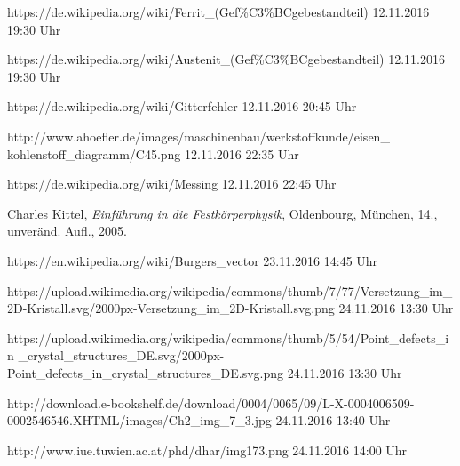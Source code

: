 \documentclass[german, %
parskip=full, %
bibliography=totoc, %
]{scrartcl}
\begin{document}
\begin{thebibliography}{9}

  https://de.wikipedia.org/wiki/Ferrit\_(Gef\%C3\%BCgebestandteil)
	12.11.2016
	19:30 Uhr
	
  https://de.wikipedia.org/wiki/Austenit\_(Gef\%C3\%BCgebestandteil)
	12.11.2016
	19:30 Uhr
	
  https://de.wikipedia.org/wiki/Gitterfehler
	12.11.2016
	20:45 Uhr	
	
  http://www.ahoefler.de/images/maschinenbau/werkstoffkunde/eisen\_
	kohlenstoff\_diagramm/C45.png
	12.11.2016
	22:35 Uhr	
	
  https://de.wikipedia.org/wiki/Messing
	12.11.2016
	22:45 Uhr	
	
  Charles Kittel,
  \emph{Einführung in die Festkörperphysik},
  Oldenbourg, München,
  14., unveränd. Aufl.,
  2005.
  
  https://en.wikipedia.org/wiki/Burgers\_vector
	23.11.2016
	14:45 Uhr
	
  https://upload.wikimedia.org/wikipedia/commons/thumb/7/77/Versetzung\_im\_2D-Kristall.svg/2000px-Versetzung\_im\_2D-Kristall.svg.png
	24.11.2016
	13:30 Uhr
	
  https://upload.wikimedia.org/wikipedia/commons/thumb/5/54/Point\_defects\_in
	\_crystal\_structures\_DE.svg/2000px-Point\_defects\_in\_crystal\_structures\_DE.svg.png
	24.11.2016
	13:30 Uhr	
	
  http://download.e-bookshelf.de/download/0004/0065/09/L-X-0004006509-0002546546.XHTML/images/Ch2\_img\_7\_3.jpg
	24.11.2016
	13:40 Uhr
	
  http://www.iue.tuwien.ac.at/phd/dhar/img173.png
	24.11.2016
	14:00 Uhr

\end{thebibliography}
\end{document}
